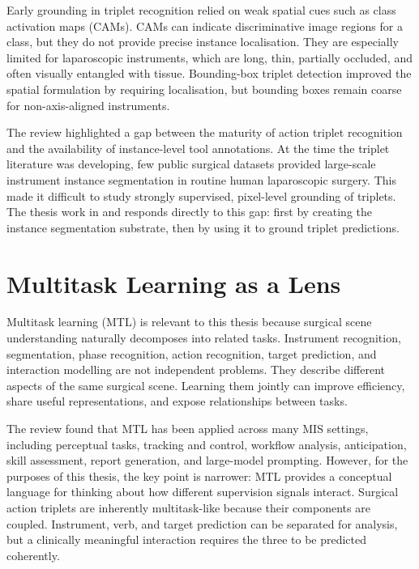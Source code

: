 Early grounding in triplet recognition relied on weak spatial cues such as class activation maps (CAMs). CAMs can indicate discriminative image regions for a class, but they do not provide precise instance localisation. They are especially limited for laparoscopic instruments, which are long, thin, partially occluded, and often visually entangled with tissue. Bounding-box triplet detection improved the spatial formulation by requiring localisation, but bounding boxes remain coarse for non-axis-aligned instruments.

The review highlighted a gap between the maturity of action triplet recognition and the availability of instance-level tool annotations. At the time the triplet literature was developing, few public surgical datasets provided large-scale instrument instance segmentation in routine human laparoscopic surgery. This made it difficult to study strongly supervised, pixel-level grounding of triplets. The thesis work in  and  responds directly to this gap: first by creating the instance segmentation substrate, then by using it to ground triplet predictions.

\section{Multitask Learning as a Lens}
\label{sec:background-mtl}

Multitask learning (MTL) is relevant to this thesis because surgical scene understanding naturally decomposes into related tasks. Instrument recognition, segmentation, phase recognition, action recognition, target prediction, and interaction modelling are not independent problems. They describe different aspects of the same surgical scene. Learning them jointly can improve efficiency, share useful representations, and expose relationships between tasks.

The review found that MTL has been applied across many MIS settings, including perceptual tasks, tracking and control, workflow analysis, anticipation, skill assessment, report generation, and large-model prompting. However, for the purposes of this thesis, the key point is narrower: MTL provides a conceptual language for thinking about how different supervision signals interact. Surgical action triplets are inherently multitask-like because their components are coupled. Instrument, verb, and target prediction can be separated for analysis, but a clinically meaningful interaction requires the three to be predicted coherently.

